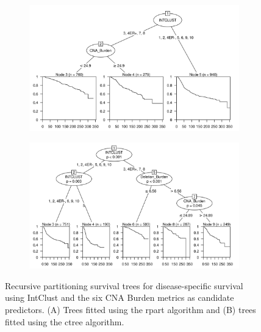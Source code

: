 \begin{figure}[!h]
\centering

\vspace{0.5cm}

\begin{subfigure}{\textwidth}
\subcaption{}
\includegraphics[width=1\textwidth]{../figures/Chapter_3/PartyKit_Survival_Burden_DSS_INTCLUST.png}
\end{subfigure}

\vspace{2cm}

\begin{subfigure}{\textwidth}
\subcaption{}
\includegraphics[width=1\textwidth]{../figures/Chapter_3/Ctree_Survival_Burden_DSS_INTCLUST.png}
\end{subfigure}

\vspace{0.5cm}

\caption[Recursive partitioning survival trees for disease-specific survival using IntClust and the six CNA Burden metrics as candidate predictors.]{Recursive partitioning survival trees for disease-specific survival using IntClust and the six CNA Burden metrics as candidate predictors. (A) Trees fitted using the rpart algorithm and (B) trees fitted using the ctree algorithm.}
\label{fig:INTCLUST_CNA_Burden_DSS}
\end{figure}

